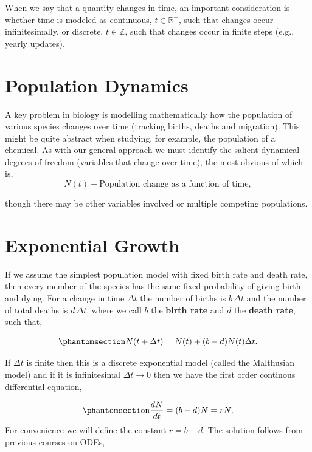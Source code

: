 \documentclass[
  letterpaper,
  DIV=11,
  numbers=noendperiod]{scrreprt}
\begin{document}
When we say that a quantity changes in time, an important consideration
is whether time is modeled as continuous, \(t \in \mathbb{R}^+\), such
that changes occur infinitesimally, or discrete, \(t \in \mathbb{Z}\),
such that changes occur in finite steps (e.g., yearly updates).

\section{Population Dynamics}\label{population-dynamics}

A key problem in biology is modelling mathematically how the population
of various species changes over time (tracking births, deaths and
migration). This might be quite abstract when studying, for example, the
population of a chemical. As with our general approach we must identify
the salient dynamical degrees of freedom (variables that change over
time), the most obvious of which is,
\[N(t) - \text{Population change as a function of time},\]

though there may be other variables involved or multiple competing
populations.

\section{Exponential Growth}\label{exponential-growth}

If we assume the simplest population model with fixed birth rate and
death rate, then every member of the species has the same fixed
probability of giving birth and dying. For a change in time \(\Delta t\)
the number of births is \(b\,\Delta t\) and the number of total deaths
is \(d\, \Delta t\), where we call \(b\) the \textbf{birth rate} and
\(d\) the \textbf{death rate}, such that,

\begin{equation}\protect\phantomsection\label{eq-exponential}{
N(t + \Delta t) = N(t) + (b - d)N(t)\Delta t.
}\end{equation}

If \(\Delta t\) is finite then this is a discrete exponential model
(called the Malthusian model) and if it is infinitesimal
\(\Delta t \rightarrow 0\) then we have the first order continous
differential equation,

\begin{equation}\protect\phantomsection\label{eq-continousExp}{
\frac{dN}{dt} = (b-d)N = rN.
}\end{equation} For convenience we will define the constant \(r = b-d\).
The solution follows from previous courses on ODEs,
\end{document}
